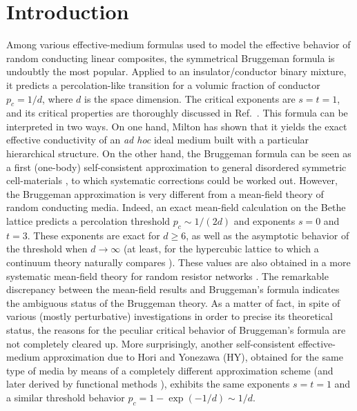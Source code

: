 \vskip 1cm


\section{Introduction}
Among various effective-medium formulas used to model the effective
behavior of random conducting linear composites, the symmetrical
Bruggeman formula \cite{BRUG35,LAND52} is undoubtly the most
popular. Applied to an insulator/conductor binary mixture, it predicts
a percolation-like transition \cite{KIRK71,CLER90,STAU92,SAHI98} for a
volumic fraction of conductor $p_c=1/d$, where $d$ is the space
dimension. The critical exponents are $s=t=1$, and its critical properties
are thoroughly discussed in Ref.\ \cite{CLER90}. This formula can be
interpreted in two ways. On one hand, Milton has shown \cite{MILT85} that it
yields the exact effective conductivity of an {\it ad hoc} ideal medium
built with a particular hierarchical structure. On the other hand, the
Bruggeman formula can be seen as a first (one-body) self-consistent
approximation to general disordered symmetric cell-materials
\cite{MILL69}, to which systematic corrections could be worked
out. However, the Bruggeman approximation is very different from a
mean-field theory of random conducting media. Indeed, an exact
mean-field calculation on the Bethe lattice \cite{STIN73,STRA74} predicts a
percolation threshold $p_c\sim 1/(2d)$ and exponents $s=0$ and
$t=3$. These exponents are exact for $d\geq 6$, as well as the
asymptotic behavior of the threshold when $d\to\infty$ (at least, for
the hypercubic lattice \cite{STAU92} to which a continuum theory
naturally compares \cite{NOTE1}). These values are also obtained in a
more systematic mean-field theory for random resistor networks
\cite{STEP77}.
The remarkable discrepancy between the mean-field results and
Bruggeman's formula indicates the ambiguous status of the Bruggeman
theory. As a matter of fact, in spite of various (mostly perturbative)
investigations \cite{HORI75,BERG81,LUCK91} in order to precise its
theoretical status, the reasons for the peculiar critical behavior of
Bruggeman's formula are not completely cleared up. 
More surprisingly, another
self-consistent effective-medium approximation \cite{HORI75,HORI77} due
to Hori and Yonezawa (HY), obtained for the same type of media by means
of a completely different approximation scheme (and later derived by
functional methods \cite{BART93}), exhibits the same exponents $s=t=1$
and a similar threshold behavior $p_c=1-\exp(-1/d)\sim 1/d$.

